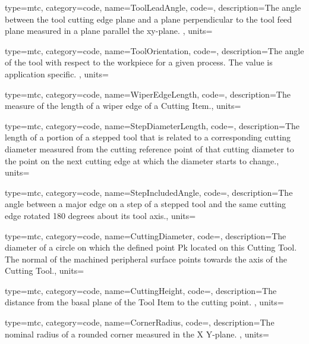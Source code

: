 {
  type=mtc,
  category=code,
  name={ToolLeadAngle},
  code=,
  description={The angle between the tool cutting edge plane and a plane perpendicular to the tool feed plane measured in a plane parallel the xy-plane. },
  units=
}


{
  type=mtc,
  category=code,
  name={ToolOrientation},
  code=,
  description={The angle of the tool with respect to the workpiece for a given process. The value is application specific. },
  units=
}


{
  type=mtc,
  category=code,
  name={WiperEdgeLength},
  code=,
  description={The measure of the length of a wiper edge of a Cutting Item.},
  units=
}


{
  type=mtc,
  category=code,
  name={StepDiameterLength},
  code=,
  description={The length of a portion of a stepped tool that is related to a corresponding cutting diameter measured from the cutting reference point of that cutting diameter to the point on the next cutting edge at which the diameter starts to change.},
  units=
}


{
  type=mtc,
  category=code,
  name={StepIncludedAngle},
  code=,
  description={The angle between a major edge on a step of a stepped tool and the same cutting edge rotated 180 degrees about its tool axis.},
  units=
}


{
  type=mtc,
  category=code,
  name={CuttingDiameter},
  code=,
  description={The diameter of a circle on which the defined point Pk located on this Cutting Tool. The normal of the machined peripheral surface points towards the axis of the Cutting Tool.},
  units=
}


{
  type=mtc,
  category=code,
  name={CuttingHeight},
  code=,
  description={The distance from the basal plane of the Tool Item to the cutting point. },
  units=
}


{
  type=mtc,
  category=code,
  name={CornerRadius},
  code=,
  description={The nominal radius of a rounded corner measured in the X Y-plane. },
  units=
}


